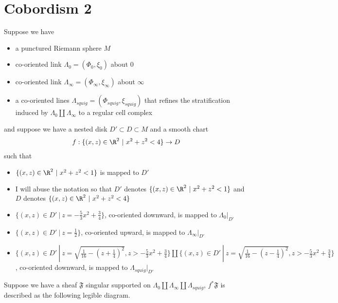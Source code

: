 \section{Cobordism 2}
Suppose we have 
\begin{itemize}
\item a punctured Riemann sphere $M$

\item co-oriented link $\Lambda_0 = (\Phi_0,\xi_0)$ about $0$

\item co-oriented link $\Lambda_\infty = (\Phi_\infty,\xi_\infty)$ about $\infty$ 

\item a co-oriented lines $\Lambda_{squig} = (\Phi_{squig}, \xi_{squig})$ that refines the stratification induced by $\Lambda_0 \coprod \Lambda_\infty$ to a regular cell complex 
\end{itemize}
and suppose we have a nested disk $D' \subset D \subset M$ and a smooth chart
\[
	f: \{(x,z)\in \R^2 ~|~ x^2+z^2 < 4 \} \rightarrow D
\]
such that 
\begin{itemize}
\item $\{(x,z)\in \R^2 ~|~ x^2+z^2 < 1\}$ is mapped to $D'$ 

\item I will abuse the notation so that $D'$ denotes $\{(x,z)\in \R^2 ~|~ x^2+z^2 < 1\}$ and $D$ denotes $\{(x,z)\in \R^2 ~|~ x^2+z^2 < 4 \}$

\item $\{(x,z)\in D' ~|~ z = -\frac{5}{3}x^2 + \frac{3}{4} \}$, co-oriented downward, is mapped to $\Lambda_0 |_{D'}$

\item $\{(x,z)\in D' ~|~ z = \frac{1}{2} \}$, co-oriented upward, is mapped to $\Lambda_\infty |_{D'}$

\item $\{(x,z)\in D' ~|~ z=\sqrt{\frac{1}{16} - (z+\frac{1}{4})^2}, z > -\frac{5}{3}x^2 + \frac{3}{4} \} \coprod \{(x,z)\in D' ~|~ z=\sqrt{\frac{1}{16} - (z-\frac{1}{4})^2}, z > -\frac{5}{3}x^2 + \frac{3}{4} \}$, co-oriented downward, is mapped to $\Lambda_{squig} |_{D'}$
\end{itemize}
Suppose we have a sheaf $\mathfrak{F}$ singular supported on $\Lambda_0 \coprod \Lambda_\infty \coprod \Lambda_{squig}$, $f^*\mathfrak{F}$ is described as the following legible diagram.

